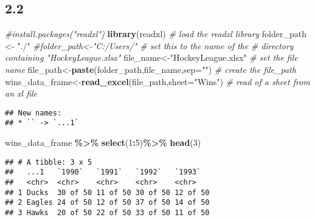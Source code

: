 \documentclass[
]{article}
\newenvironment{Shaded}{\begin{snugshade}}{\end{snugshade}}
\newcommand{\AttributeTok}[1]{\textcolor[rgb]{0.13,0.29,0.53}{#1}}
\newcommand{\CommentTok}[1]{\textcolor[rgb]{0.56,0.35,0.01}{\textit{#1}}}
\newcommand{\DecValTok}[1]{\textcolor[rgb]{0.00,0.00,0.81}{#1}}
\newcommand{\FunctionTok}[1]{\textcolor[rgb]{0.13,0.29,0.53}{\textbf{#1}}}
\newcommand{\NormalTok}[1]{#1}
\newcommand{\OtherTok}[1]{\textcolor[rgb]{0.56,0.35,0.01}{#1}}
\newcommand{\SpecialCharTok}[1]{\textcolor[rgb]{0.81,0.36,0.00}{\textbf{#1}}}
\newcommand{\StringTok}[1]{\textcolor[rgb]{0.31,0.60,0.02}{#1}}
\begin{document}
\hypertarget{section-3}{%
\subsection{2.2}\label{section-3}}

\begin{Shaded}
\begin{Highlighting}[]
\CommentTok{\#install.packages("readxl")}
\FunctionTok{library}\NormalTok{(readxl) }\CommentTok{\# load the readxl library}
\NormalTok{folder\_path }\OtherTok{\textless{}{-}} \StringTok{"./"}
\CommentTok{\#folder\_path\textless{}{-}"C:/Users/" \# set this to the name of the}
\CommentTok{\# directory containing "HockeyLeague.xlsx"}
\NormalTok{file\_name}\OtherTok{\textless{}{-}}\StringTok{"HockeyLeague.xlsx"} \CommentTok{\# set the file name}
\NormalTok{file\_path}\OtherTok{\textless{}{-}}\FunctionTok{paste}\NormalTok{(folder\_path,file\_name,}\AttributeTok{sep=}\StringTok{""}\NormalTok{) }\CommentTok{\# create the file\_path}
\NormalTok{wins\_data\_frame}\OtherTok{\textless{}{-}}\FunctionTok{read\_excel}\NormalTok{(file\_path,}\AttributeTok{sheet=}\StringTok{"Wins"}\NormalTok{) }\CommentTok{\# read of a sheet from an xl file}
\end{Highlighting}
\end{Shaded}

\begin{verbatim}
## New names:
## * `` -> `...1`
\end{verbatim}

\begin{Shaded}
\begin{Highlighting}[]
\NormalTok{wins\_data\_frame }\SpecialCharTok{\%\textgreater{}\%}
\FunctionTok{select}\NormalTok{(}\DecValTok{1}\SpecialCharTok{:}\DecValTok{5}\NormalTok{)}\SpecialCharTok{\%\textgreater{}\%}
\FunctionTok{head}\NormalTok{(}\DecValTok{3}\NormalTok{)}
\end{Highlighting}
\end{Shaded}

\begin{verbatim}
## # A tibble: 3 x 5
##   ...1   `1990`   `1991`   `1992`   `1993`  
##   <chr>  <chr>    <chr>    <chr>    <chr>   
## 1 Ducks  30 of 50 11 of 50 30 of 50 12 of 50
## 2 Eagles 24 of 50 12 of 50 37 of 50 14 of 50
## 3 Hawks  20 of 50 22 of 50 33 of 50 11 of 50
\end{verbatim}
\end{document}
